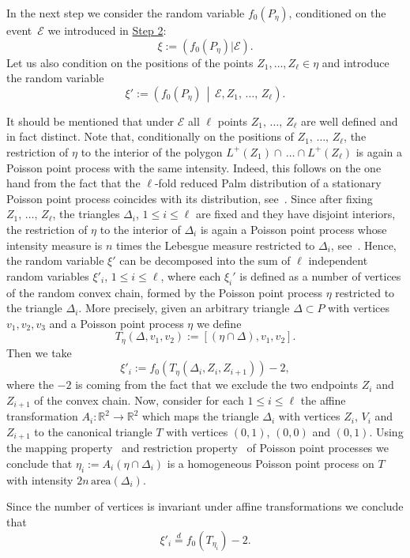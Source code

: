 \documentclass[AHL,Unicode,longabstracts,published]{cedram}
\newcommand{\bbR}{\mathbb{R}}
\newcommand{\clE}{\mathcal{E}}
\newcommand{\area}{\mathrm{area}}
\begin{document}
In the next step we consider the random variable $f_0(P_{\eta})$, conditioned on the event~$\clE$ we introduced in \hyperref[step2]{Step 2}:
\[
\xi:=(f_0(P_{\eta})|\clE).
\]
Let us also condition on the positions of the points $Z_1,\dots,Z_\ell \in \eta$ and introduce the random variable
\[
\xi':= \left(f_0(P_{\eta})\,\middle|\,\clE, Z_1,\,\ldots,\,Z_\ell\right).
\]

It should be mentioned that under $\clE$ all $\ell$ points $Z_1,\,\ldots,\,Z_\ell$ are well defined and in fact distinct. Note that, conditionally on the positions of $Z_1,\,\ldots,\,Z_\ell$, the restriction of $\eta$ to the interior of the polygon $L^+(Z_1) \cap \,\dots \cap L^+(Z_\ell)$ is again a Poisson point process with the same intensity. Indeed, this follows on the one hand from the fact that the $\ell$-fold reduced Palm distribution of a stationary Poisson point process coincides with its distribution, see~\cite[Corollary~1]{Hanisch82}. Since after fixing $Z_1,\,\ldots,\,Z_\ell$, the triangles $\Delta_i$, $1\leq i\leq \ell$ are fixed and they have disjoint interiors, the restriction of $\eta$ to the interior of $\Delta_i$ is again a Poisson point process whose intensity measure is $n$ times the Lebesgue measure restricted to $\Delta_i$, see~\cite[Theorem~5.2]{LP}. Hence, the random variable $\xi'$ can be decomposed into the sum of $\ell$ independent random variables $\xi'_i$, $1\leq i\leq \ell$, where each $\xi_i'$ is defined as a number of vertices of the random convex chain, formed by the Poisson point process $\eta$ restricted to the triangle $\Delta_i$. More precisely, given an arbitrary triangle $\Delta\subset P$ with vertices $v_1,v_2,v_3$ and a Poisson point process $\eta$ we define
\[
T_{\eta}(\Delta,v_1,v_2):=[(\eta\cap\Delta), v_1,v_2].
\]
Then we take
\[
\xi'_i:= f_0(T_{\eta}(\Delta_i,Z_i,Z_{i+1}))-2,
\]
where the $-2$ is coming from the fact that we exclude the two endpoints $Z_i$ and $Z_{i+1}$ of the convex chain. Now, consider for each $1\leq i\leq \ell$ the affine transformation $A_i:\bbR^2\to\bbR^2$ which maps the triangle $\Delta_i$ with vertices $Z_i$, $V_i$ and $Z_{i+1}$ to the canonical triangle $T$ with vertices $(0,1)$, $(0,0)$ and $(0,1)$. Using the mapping property~\cite[Theorem~5.1]{LP} and restriction property~\cite[Theorem~5.2]{LP} of Poisson point processes we conclude that $\eta_i:=A_i(\eta\cap\Delta_i)$ is a homogeneous Poisson point process on $T$ with intensity $2n\,{\area}(\Delta_i)$.

Since the number of vertices is invariant under affine transformations we conclude that
\[
\xi'_i\stackrel{d}{=} f_0(T_{\eta_i})-2.
\]
\end{document}

